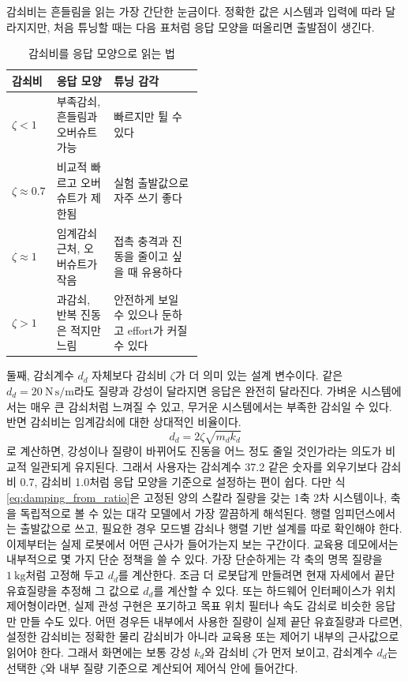 감쇠비는 흔들림을 읽는 가장 간단한 눈금이다.
정확한 값은 시스템과 입력에 따라 달라지지만, 처음 튜닝할 때는 다음 표처럼 응답 모양을 떠올리면 출발점이 생긴다.
\begin{table}[!htbp]
  \centering
  \caption{감쇠비를 응답 모양으로 읽는 법}
  \small
  \setlength{\tabcolsep}{4pt}
  \begin{tabularx}{\linewidth}{@{}>{\raggedright\arraybackslash}p{0.18\linewidth}>{\raggedright\arraybackslash}p{0.30\linewidth}>{\raggedright\arraybackslash}X@{}}
    \toprule
    감쇠비 & 응답 모양 & 튜닝 감각 \\
    \midrule
    $\zeta<1$ & 부족감쇠, 흔들림과 오버슈트 가능 & 빠르지만 튈 수 있다 \\
    $\zeta\approx0.7$ & 비교적 빠르고 오버슈트가 제한됨 & 실험 출발값으로 자주 쓰기 좋다 \\
    $\zeta\approx1$ & 임계감쇠 근처, 오버슈트가 작음 & 접촉 충격과 진동을 줄이고 싶을 때 유용하다 \\
    $\zeta>1$ & 과감쇠, 반복 진동은 적지만 느림 & 안전하게 보일 수 있으나 둔하고 effort가 커질 수 있다 \\
    \bottomrule
  \end{tabularx}
\end{table}

둘째, 감쇠계수 $d_d$ 자체보다 감쇠비 $\zeta$가 더 의미 있는 설계 변수이다.
같은 $d_d=20~\mathrm{N\,s/m}$라도 질량과 강성이 달라지면 응답은 완전히 달라진다.
가벼운 시스템에서는 매우 큰 감쇠처럼 느껴질 수 있고, 무거운 시스템에서는 부족한 감쇠일 수 있다.
반면 감쇠비는 임계감쇠에 대한 상대적인 비율이다.
\begin{equation}
  d_d=2\zeta\sqrt{m_d k_d}
  \label{eq:damping_from_ratio}
\end{equation}
로 계산하면, 강성이나 질량이 바뀌어도 진동을 어느 정도 줄일 것인가라는 의도가 비교적 일관되게 유지된다.
그래서 사용자는 감쇠계수 37.2 같은 숫자를 외우기보다 감쇠비 0.7, 감쇠비 1.0처럼 응답 모양을 기준으로 설정하는 편이 쉽다.
다만 식 \eqref{eq:damping_from_ratio}은 고정된 양의 스칼라 질량을 갖는 1축 2차 시스템이나, 축을 독립적으로 볼 수 있는 대각 모델에서 가장 깔끔하게 해석된다.
행렬 임피던스에서는 출발값으로 쓰고, 필요한 경우 모드별 감쇠나 행렬 기반 설계를 따로 확인해야 한다.
이제부터는 실제 로봇에서 어떤 근사가 들어가는지 보는 구간이다.
교육용 데모에서는 내부적으로 몇 가지 단순 정책을 쓸 수 있다.
가장 단순하게는 각 축의 명목 질량을 $1~\mathrm{kg}$처럼 고정해 두고 $d_d$를 계산한다.
조금 더 로봇답게 만들려면 현재 자세에서 끝단 유효질량을 추정해 그 값으로 $d_d$를 계산할 수 있다.
또는 하드웨어 인터페이스가 위치 제어형이라면, 실제 관성 구현은 포기하고 목표 위치 필터나 속도 감쇠로 비슷한 응답만 만들 수도 있다.
어떤 경우든 내부에서 사용한 질량이 실제 끝단 유효질량과 다르면, 설정한 감쇠비는 정확한 물리 감쇠비가 아니라 교육용 또는 제어기 내부의 근사값으로 읽어야 한다.
그래서 화면에는 보통 강성 $k_d$와 감쇠비 $\zeta$가 먼저 보이고, 감쇠계수 $d_d$는 선택한 $\zeta$와 내부 질량 기준으로 계산되어 제어식 안에 들어간다.

